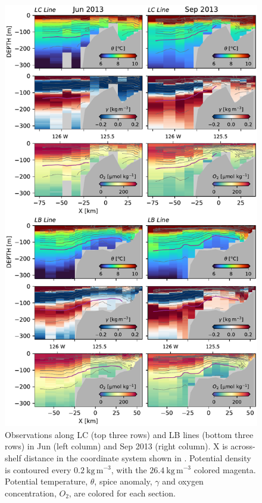 \documentclass[draft]{agujournal2019}
\begin{document}
\begin{figure}[htbp]
  \begin{center}
     \includegraphics[width=130mm]{LaPerouse2013Ctd}
     \caption{Observations along LC (top three rows) and LB lines (bottom three rows) in Jun (left column) and Sep 2013 (right column).  X is across-shelf distance in the coordinate system shown in . Potential density is contoured every $0.2\ \mathrm{kg\,m^{-3}}$, with the $26.4\ \mathrm{kg\,m^{-3}}$ colored magenta.  Potential temperature, $\theta$, spice anomaly, $\gamma$ and oxygen concentration, $O_2$, are colored for each section.}
     \label{fig:LaPerouse2013Ctd}
  \end{center}
\end{figure}
\end{document}
